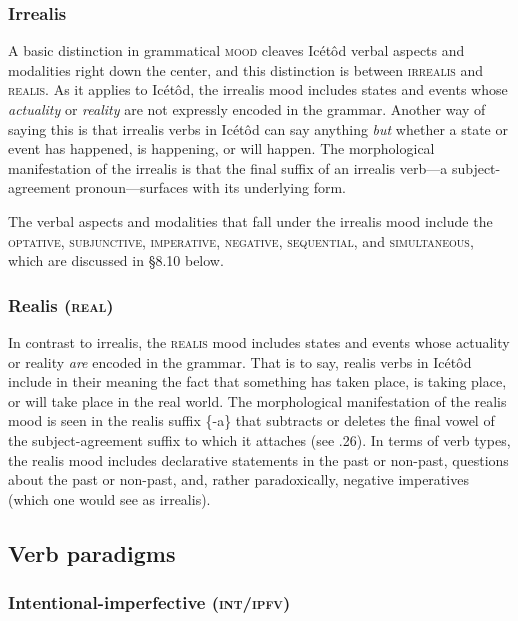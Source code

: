 \subsubsection{Irrealis}

A basic distinction in grammatical \textsc{mood} cleaves Icétôd verbal aspects and modalities right down the center, and this distinction is between \textsc{irrealis} and \textsc{realis}. As it applies to Icétôd, the irrealis mood includes states and events whose \textit{actuality} or \textit{reality} are not expressly encoded in the grammar. Another way of saying this is that irrealis verbs in Icétôd can say anything \textit{but} whether a state or event has happened, is happening, or will happen. The morphological manifestation of the irrealis is that the final suffix of an irrealis verb—a subject-agreement pronoun—surfaces with its underlying form. 

The verbal aspects and modalities that fall under the irrealis mood include the \textsc{optative}, \textsc{subjunctive}, \textsc{imperative}, \textsc{negative}, \textsc{sequential}, and \textsc{simultaneous}, which are discussed in §8.10 below. 


\subsubsection{Realis (\textsc{real})}

In contrast to irrealis, the \textsc{realis} mood includes states and events whose actuality or reality \textit{are} encoded in the grammar. That is to say, realis verbs in Icétôd include in their meaning the fact that something has taken place, is taking place, or will take place in the real world. The morphological manifestation of the realis mood is seen in the realis suffix \{-a\} that subtracts or deletes the final vowel of the subject-agreement suffix to which it attaches (see .26). In terms of verb types, the realis mood includes declarative statements in the past or non-past, questions about the past or non-past, and, rather paradoxically, negative imperatives (which one would see as irrealis).




\subsection{Verb paradigms}
\subsubsection{Intentional-imperfective (\textsc{int/ipfv})}

